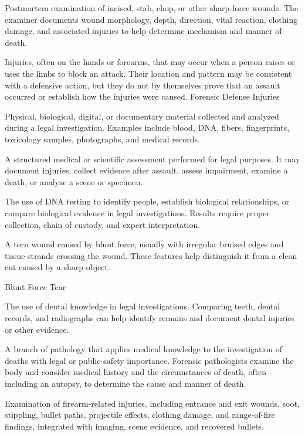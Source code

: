  Postmortem examination of incised, stab, chop, or other sharp-force wounds. The examiner documents wound morphology, depth, direction, vital reaction, clothing damage, and associated injuries to help determine mechanism and manner of death.

 Injuries, often on the hands or forearms, that may occur when a person raises or uses the limbs to block an attack. Their location and pattern may be consistent with a defensive action, but they do not by themselves prove that an assault occurred or establish how the injuries were caused.
\synonyms
Forensic Defense Injuries

 Physical, biological, digital, or documentary material collected and analyzed during a legal investigation. Examples include blood, DNA, fibers, fingerprints, toxicology samples, photographs, and medical records.

 A structured medical or scientific assessment performed for legal purposes. It may document injuries, collect evidence after assault, assess impairment, examine a death, or analyze a scene or specimen.

 The use of DNA testing to identify people, establish biological relationships, or compare biological evidence in legal investigations. Results require proper collection, chain of custody, and expert interpretation.

 A torn wound caused by blunt force, usually with irregular bruised edges and tissue strands crossing the wound. These features help distinguish it from a clean cut caused by a sharp object.

\synonyms
Blunt Force Tear

 The use of dental knowledge in legal investigations. Comparing teeth, dental records, and radiographs can help identify remains and document dental injuries or other evidence.

 A branch of pathology that applies medical knowledge to the investigation of deaths with legal or public-safety importance. Forensic pathologists examine the body and consider medical history and the circumstances of death, often including an autopsy, to determine the cause and manner of death.

 Examination of firearm-related injuries, including entrance and exit wounds, soot, stippling, bullet paths, projectile effects, clothing damage, and range-of-fire findings, integrated with imaging, scene evidence, and recovered bullets.

